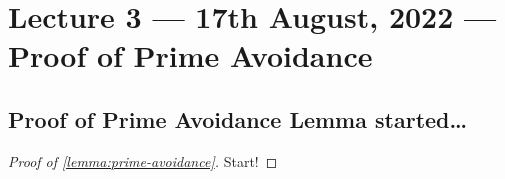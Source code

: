 \section{Lecture 3 --- 17th August, 2022 --- Proof of Prime Avoidance}
\subsection{Proof of Prime Avoidance Lemma started\dots}
\begin{proof}[Proof of \ref{lemma:prime-avoidance}]
    Start! 
\end{proof}
